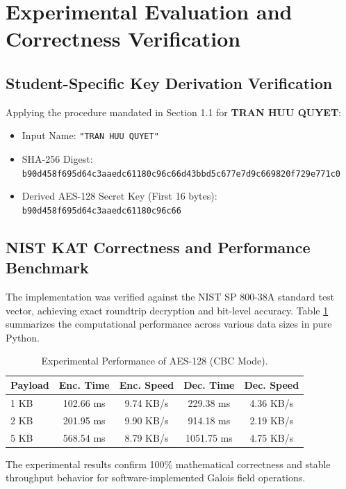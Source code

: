 \section{Experimental Evaluation and Correctness Verification}
\subsection{Student-Specific Key Derivation Verification}
Applying the procedure mandated in Section 1.1 for \textbf{TRAN HUU QUYET}:
\begin{itemize}
    \item Input Name: \texttt{"TRAN HUU QUYET"}
    \item SHA-256 Digest:\\ \small\texttt{b90d458f695d64c3aaedc61180c96c66d43bbd5c677e7d9c669820f729e771c0}
    \item Derived AES-128 Secret Key (First 16 bytes): \texttt{b90d458f695d64c3aaedc61180c96c66}
\end{itemize}

\subsection{NIST KAT Correctness and Performance Benchmark}
The implementation was verified against the NIST SP 800-38A standard test vector, achieving exact roundtrip decryption and bit-level accuracy. Table \ref{tab:aes_perf} summarizes the computational performance across various data sizes in pure Python.

\begin{table}[H]
\centering
\caption{Experimental Performance of AES-128 (CBC Mode).}
\label{tab:aes_perf}
\small
\begin{tabular*}{\linewidth}{@{\extracolsep{\fill}}lcccc}
\toprule
\textbf{Payload} & \textbf{Enc. Time} & \textbf{Enc. Speed} & \textbf{Dec. Time} & \textbf{Dec. Speed} \\
\midrule
1 KB  & 102.66 ms & 9.74 KB/s & 229.38 ms & 4.36 KB/s \\
2 KB  & 201.95 ms & 9.90 KB/s & 914.18 ms & 2.19 KB/s \\
5 KB  & 568.54 ms & 8.79 KB/s & 1051.75 ms & 4.75 KB/s \\
\bottomrule
\end{tabular*}
\end{table}
The experimental results confirm 100\% mathematical correctness and stable throughput behavior for software-implemented Galois field operations.

